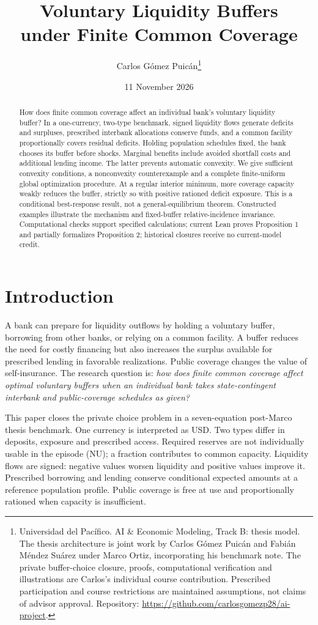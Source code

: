 \documentclass[11pt]{article}
\title{Voluntary Liquidity Buffers\\under Finite Common Coverage}
\author{Carlos G\'omez Puic\'an\thanks{Universidad del Pac\'ifico. AI \& Economic Modeling, Track B: thesis model. The thesis architecture is joint work by Carlos G\'omez Puic\'an and Fabi\'an M\'endez Su\'arez under Marco Ortiz, incorporating his benchmark note. The private buffer-choice closure, proofs, computational verification and illustrations are Carlos's individual course contribution. Prescribed participation and course restrictions are maintained assumptions, not claims of advisor approval. Repository: \url{https://github.com/carlosgomezp28/ai-project}.}}
\date{11 November 2026}
\theoremstyle{definition}
\begin{document}
\maketitle
\begin{abstract}
How does finite common coverage affect an individual bank's voluntary liquidity buffer? In a one-currency, two-type benchmark, signed liquidity flows generate deficits and surpluses, prescribed interbank allocations conserve funds, and a common facility proportionally covers residual deficits. Holding population schedules fixed, the bank chooses its buffer before shocks. Marginal benefits include avoided shortfall costs and additional lending income. The latter prevents automatic convexity. We give sufficient convexity conditions, a nonconvexity counterexample and a complete finite-uniform global optimization procedure. At a regular interior minimum, more coverage capacity weakly reduces the buffer, strictly so with positive rationed deficit exposure. This is a conditional best-response result, not a general-equilibrium theorem. Constructed examples illustrate the mechanism and fixed-buffer relative-incidence invariance. Computational checks support specified calculations; current Lean proves Proposition 1 and partially formalizes Proposition 2; historical closures receive no current-model credit.
\end{abstract}

\section{Introduction}
A bank can prepare for liquidity outflows by holding a voluntary buffer, borrowing from other banks, or relying on a common facility. A buffer reduces the need for costly financing but also increases the surplus available for prescribed lending in favorable realizations. Public coverage changes the value of self-insurance. The research question is: \emph{how does finite common coverage affect optimal voluntary buffers when an individual bank takes state-contingent interbank and public-coverage schedules as given?}

This paper closes the private choice problem in a seven-equation post-Marco thesis benchmark. One currency is interpreted as USD. Two types differ in deposits, exposure and prescribed access. Required reserves are not individually usable in the episode (NU); a fraction contributes to common capacity. Liquidity flows are signed: negative values worsen liquidity and positive values improve it. Prescribed borrowing and lending conserve conditional expected amounts at a reference population profile. Public coverage is free at use and proportionally rationed when capacity is insufficient.
\end{document}
